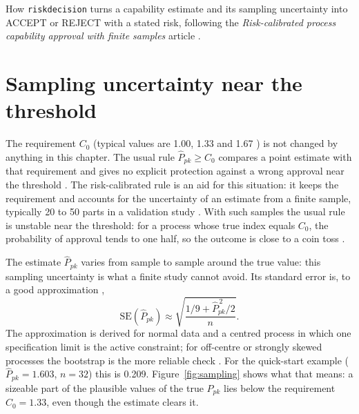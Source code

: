 \documentclass[a4paper,11pt,oneside,openany,parskip=half-,headings=standardclasses,toc=flat,numbers=noenddot]{scrbook}
\newcommand{\code}[1]{\texttt{\begingroup\def\_{\textunderscore\allowbreak}#1\endgroup}}
\newenvironment{chapterintro}{\begingroup\sffamily\small\color{muted}\noindent\ignorespaces}{\par\endgroup\medskip}
\newcommand{\figref}[1]{Figure~\ref{#1}}
\newcommand{\Ppkhat}{\widehat{P}_{pk}}
\begin{document}
\begin{chapterintro}
How \code{risk\_decision} turns a capability estimate and its sampling uncertainty into ACCEPT or REJECT
with a stated risk, following the \emph{Risk-calibrated process capability approval with finite samples}
article \cite{jy-risk}.
\end{chapterintro}

\section{Sampling uncertainty near the threshold}

The requirement $C_0$ (typical values are 1.00, 1.33 and 1.67 \cite[Sec.~1]{jy-risk}) is not changed by anything in
this chapter. The usual rule
$\Ppkhat \ge C_0$ compares a point estimate with that requirement and gives no explicit protection against a wrong
approval near the threshold \cite[Sec.~7]{jy-risk}. The risk-calibrated rule is an aid for this situation: it keeps
the requirement and accounts for the uncertainty of an estimate from a finite sample, typically 20 to 50 parts in a
validation study \cite[Sec.~1]{jy-risk}. With such samples the usual rule is unstable near the threshold: for a
process whose true index equals $C_0$, the probability of approval tends to one half, so the outcome is close to a
coin toss \cite{jy-instability} \cite[Sec.~2.3]{jy-risk}.

The estimate $\Ppkhat$ varies from sample to sample around the true value: this sampling uncertainty is
what a finite study cannot avoid. Its standard error is, to a good approximation
\cite{jy-instability} \cite[App.~A]{jy-risk},
\begin{equation}\label{eq:se}
\mathrm{SE}(\Ppkhat) \approx \sqrt{\frac{1/9 + \Ppkhat^{\,2}/2}{n}} .
\end{equation}
The approximation is derived for normal data and a centred process in which one specification limit is the active
constraint; for off-centre or strongly skewed processes the bootstrap is the more reliable check
\cite[Sec.~5.1.3, 5.5]{jy-risk}.
For the quick-start example ($\Ppkhat = 1.603$, $n = 32$) this is 0.209. \figref{fig:sampling} shows what
that means: a sizeable part of the plausible values of the true $P_{pk}$ lies below the requirement
$C_0 = 1.33$, even though the estimate clears it.
\end{document}
